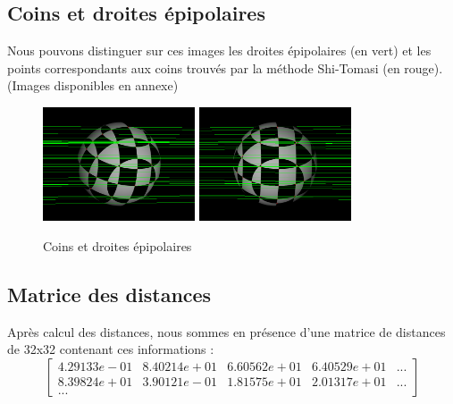 \documentclass[a4paper]{article}
\begin{document}
\subsection{Coins et droites épipolaires}

Nous pouvons distinguer sur ces images les droites épipolaires (en vert) et les points correspondants aux coins trouvés par la méthode Shi-Tomasi (en rouge).\\ (Images disponibles en annexe)

\begin{figure}[h]
\begin{center}
\includegraphics[width=170px]{left-result.png}
\includegraphics[width=170px]{right-result.png}
\end{center}
\caption{Coins et droites épipolaires}
\end{figure}

\subsection{Matrice des distances}

Après calcul des distances, nous sommes en présence d'une matrice de distances de 32x32 contenant ces informations :
\begin{equation}
\begin{bmatrix}
4.29133e-01 & 8.40214e+01 & 6.60562e+01 & 6.40529e+01 & ...\\
8.39824e+01 & 3.90121e-01 & 1.81575e+01 & 2.01317e+01 & ...\\
...
\end{bmatrix}
\end{equation}

\clearpage
\end{document}
